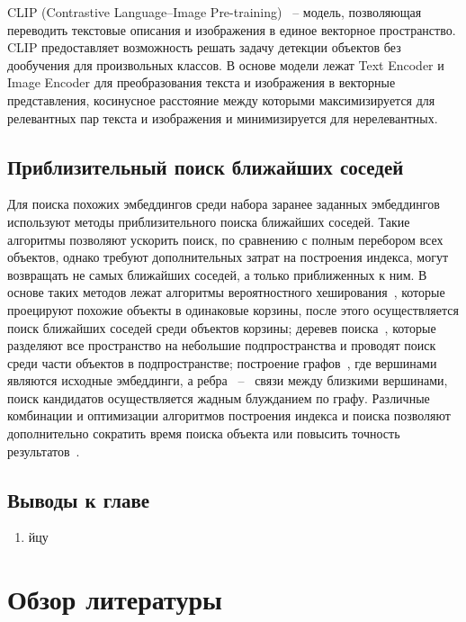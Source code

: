 \documentclass[a4paper,14pt]{article}
\begin{document}
    CLIP (Contrastive Language–Image Pre-training)~\cite{CLIP} -- модель, позволяющая переводить текстовые описания и изображения в единое векторное пространство.
    CLIP предоставляет возможность решать задачу детекции объектов без дообучения для произвольных классов.
    В основе модели лежат Text Encoder и Image Encoder для преобразования текста и изображения в векторные представления, косинусное расстояние между которыми максимизируется для релевантных пар текста и изображения и минимизируется для нерелевантных.

    \subsection{Приблизительный поиск ближайших соседей}

    Для поиска похожих эмбеддингов среди набора заранее заданных эмбеддингов используют методы приблизительного поиска ближайших соседей.
    Такие алгоритмы позволяют ускорить поиск, по сравнению с полным перебором всех объектов, однако требуют дополнительных затрат на построения индекса,
    могут возвращать не самых ближайших соседей, а только приближенных к ним.
    В основе таких методов лежат алгоритмы вероятностного хеширования~\cite{tao2010efficient}, которые проецируют похожие объекты в одинаковые корзины, после этого осуществляется поиск ближайших соседей среди объектов корзины;
    деревев поиска~\cite{liu2006new}, которые разделяют все пространство на небольшие подпространства и проводят поиск среди части объектов в подпространстве;
    построение графов~\cite{malkov2018efficient}, где вершинами являются исходные эмбеддинги, а
    ребра ~--~ связи между близкими вершинами, поиск кандидатов осуществляется жадным блужданием по графу.
    Различные комбинации и оптимизации алгоритмов построения индекса и поиска позволяют дополнительно сократить время поиска объекта или повысить точность результатов~\cite{annoy,avq_2020}.

    \subsection{Выводы к главе \thesection}
    \begin{enumerate}
        [1)]
        \itemsep0em
        \item йцу
    \end{enumerate}

    \newpage


    \section{Обзор литературы}
\end{document}
